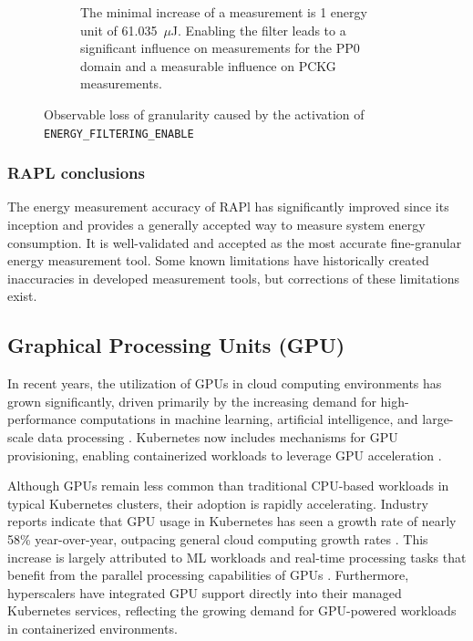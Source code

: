 \begin{itemize}
\begin{figure}[H]
\begin{subfigure}[t]{0.48\textwidth}
            \caption{The minimal increase of a measurement is 1 energy unit of 61.035~$\mu$J. Enabling the filter leads to a significant influence on measurements for the PP0 domain and a measurable influence on PCKG measurements.}
            \label{fig:rapl_filter_granularity_loss_energy}
        \end{subfigure}
        \caption[RAPL \texttt{ENERGY\_FILTERING\_ENABLE Granularity loss}]{Observable loss of granularity caused by the activation of \texttt{ENERGY\_FILTERING\_ENABLE}\parencite{schone2024energy}}
        \label{fig:rapl_filter_granularity_loss}
    \end{figure}
\end{itemize}

\subsubsection{RAPL conclusions}

The energy measurement accuracy of RAPl has significantly improved since its inception and provides a generally accepted way to measure system energy consumption. It is well-validated and accepted as the most accurate fine-granular energy measurement tool. Some known limitations have historically created inaccuracies in developed measurement tools, but corrections of these limitations exist. 

\subsection{Graphical Processing Units (GPU)}
In recent years, the utilization of GPUs in cloud computing environments has grown significantly, driven primarily by the increasing demand for high-performance computations in machine learning, artificial intelligence, and large-scale data processing \cite{jouppi2017datacenter}. Kubernetes now includes mechanisms for GPU provisioning, enabling containerized workloads to leverage GPU acceleration \cite{k8s_gpu_support}.

Although GPUs remain less common than traditional CPU-based workloads in typical Kubernetes clusters, their adoption is rapidly accelerating. Industry reports indicate that GPU usage in Kubernetes has seen a growth rate of nearly 58\% year-over-year, outpacing general cloud computing growth rates \cite{datadog_report}. This increase is largely attributed to ML workloads and real-time processing tasks that benefit from the parallel processing capabilities of GPUs \cite{tensorflow_k8s}. Furthermore, hyperscalers have integrated GPU support directly into their managed Kubernetes services, reflecting the growing demand for GPU-powered workloads in containerized environments.

